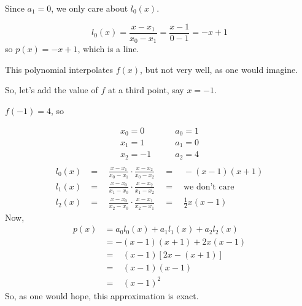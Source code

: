 Since $a_1 = 0$, we only care about $l_0(x)$.

\begin{equation*}
    l_0 (x) = \frac{x-x_1}{x_0-x_1} = \frac{x-1}{0-1} = -x + 1
\end{equation*}
so $p(x) = -x + 1$, which is a line. 

This polynomial interpolates $f(x)$, but not very well, as one would imagine.

\begin{figure}[H]
    \centering
    
    \label{fig:polynomial-1}
\end{figure}
So, let's add the value of $f$ at a third point, say $x=-1$. 

$f(-1)=4$, so 

\begin{align*}
        x_0=0& \qquad a_0 = 1 \\
        x_1=1& \qquad  a_1 = 0 \\
        x_2=-1& \qquad  a_2 = 4 \\
\end{align*}
\begin{align*}
    l_0(x) &= \quad \frac{x-x_1}{x_0-x_1} \cdot \frac{x-x_2}{x_0-x_2} \quad=\quad -(x-1)(x+1) \\
    l_1(x) &= \quad \frac{x-x_0}{x_1-x_0} \cdot \frac{x-x_2}{x_1-x_2} \quad=\quad \text{we don't care} \\
    l_2(x) &= \quad \frac{x-x_0}{x_2-x_0} \cdot \frac{x-x_1}{x_2-x_1} \quad=\quad \frac{1}{2}x(x-1)
\end{align*}
Now, \begin{align*}
    p(x) &= a_0 l_0(x) + a_1 l_1(x) + a_2 l_2(x) \\
         &= -(x-1)(x+1) + 2x(x-1) \\
         &= \;\;\;(x-1) \left[2x-(x+1)\right] \\
         &= \;\;\;(x-1)(x-1) \\
         &= \;\;\;(x-1)^2
\end{align*}
So, as one would hope, this approximation is exact. \\


